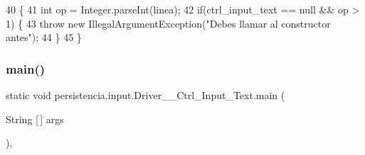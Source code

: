 \begin{DoxyCode}
40                                                                                           \{
41         \textcolor{keywordtype}{int} op = Integer.parseInt(linea);
42         \textcolor{keywordflow}{if}(ctrl\_input\_text == null && op > 1) \{
43             \textcolor{keywordflow}{throw} \textcolor{keyword}{new} IllegalArgumentException(\textcolor{stringliteral}{"Debes llamar al constructor antes"});
44         \}
45     \}
\end{DoxyCode}
\mbox{\label{classpersistencia_1_1input_1_1Driver____Ctrl__Input__Text_a38cebd4cadb9198cb6a2c87147646ec0}} 
\subsubsection{\texorpdfstring{main()}{main()}}
{\footnotesize\ttfamily static void persistencia.\+input.\+Driver\+\_\+\+\_\+\+Ctrl\+\_\+\+Input\+\_\+\+Text.\+main (\begin{DoxyParamCaption}\item[{String \mbox{[}$\,$\mbox{]}}]{args }\end{DoxyParamCaption})\hspace{0.3cm}{\ttfamily [inline]}, {\ttfamily [static]}}



